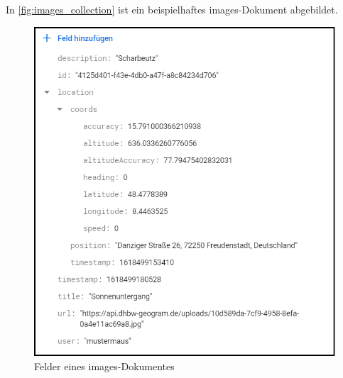 In \autoref{fig:images_collection} ist ein beispielhaftes images-Dokument abgebildet.

\begin{figure}[H]
    \centering
    \includegraphics[width=.7\linewidth]{images/collection_images.png}
    \caption{Felder eines \glqq images\grqq{}-Dokumentes}
    \label{fig:images_collection}
\end{figure}